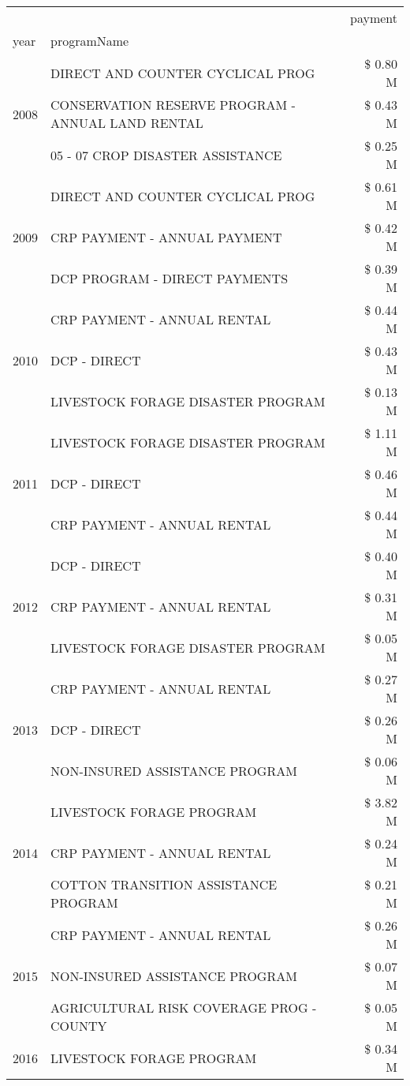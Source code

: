 \begin{tabular}{llr}
\toprule
 &  & payment \\
year & programName &  \\
\midrule
\multirow[t]{3}{*}{2008} & DIRECT AND COUNTER CYCLICAL PROG & \$ 0.80 M \\
 & CONSERVATION RESERVE PROGRAM - ANNUAL LAND RENTAL & \$ 0.43 M \\
 & 05 - 07 CROP DISASTER ASSISTANCE & \$ 0.25 M \\
\cline{1-3}
\multirow[t]{3}{*}{2009} & DIRECT AND COUNTER CYCLICAL PROG & \$ 0.61 M \\
 & CRP PAYMENT - ANNUAL PAYMENT & \$ 0.42 M \\
 & DCP PROGRAM - DIRECT PAYMENTS & \$ 0.39 M \\
\cline{1-3}
\multirow[t]{3}{*}{2010} & CRP PAYMENT - ANNUAL RENTAL & \$ 0.44 M \\
 & DCP - DIRECT & \$ 0.43 M \\
 & LIVESTOCK FORAGE DISASTER PROGRAM & \$ 0.13 M \\
\cline{1-3}
\multirow[t]{3}{*}{2011} & LIVESTOCK FORAGE DISASTER PROGRAM & \$ 1.11 M \\
 & DCP - DIRECT & \$ 0.46 M \\
 & CRP PAYMENT - ANNUAL RENTAL & \$ 0.44 M \\
\cline{1-3}
\multirow[t]{3}{*}{2012} & DCP - DIRECT & \$ 0.40 M \\
 & CRP PAYMENT - ANNUAL RENTAL & \$ 0.31 M \\
 & LIVESTOCK FORAGE DISASTER PROGRAM & \$ 0.05 M \\
\cline{1-3}
\multirow[t]{3}{*}{2013} & CRP PAYMENT - ANNUAL RENTAL & \$ 0.27 M \\
 & DCP - DIRECT & \$ 0.26 M \\
 & NON-INSURED ASSISTANCE PROGRAM & \$ 0.06 M \\
\cline{1-3}
\multirow[t]{3}{*}{2014} & LIVESTOCK FORAGE PROGRAM & \$ 3.82 M \\
 & CRP PAYMENT - ANNUAL RENTAL & \$ 0.24 M \\
 & COTTON TRANSITION ASSISTANCE PROGRAM & \$ 0.21 M \\
\cline{1-3}
\multirow[t]{3}{*}{2015} & CRP PAYMENT - ANNUAL RENTAL & \$ 0.26 M \\
 & NON-INSURED ASSISTANCE PROGRAM & \$ 0.07 M \\
 & AGRICULTURAL RISK COVERAGE PROG - COUNTY & \$ 0.05 M \\
\cline{1-3}
\multirow[t]{3}{*}{2016} & LIVESTOCK FORAGE PROGRAM & \$ 0.34 M \\

\end{tabular}

